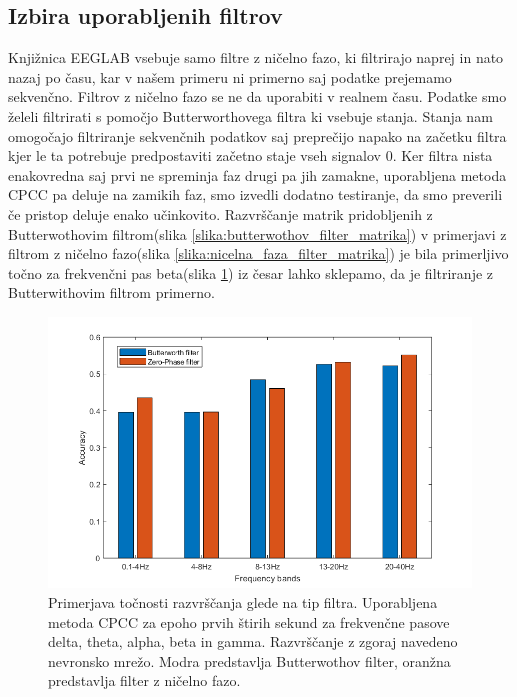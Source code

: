 \subsection{Izbira uporabljenih filtrov}
Knjižnica EEGLAB vsebuje samo filtre z ničelno fazo, ki filtrirajo naprej in nato nazaj po času, kar v našem primeru ni primerno saj podatke prejemamo sekvenčno. Filtrov z ničelno fazo se ne da uporabiti v realnem času. Podatke smo želeli filtrirati s pomočjo Butterworthovega filtra ki vsebuje stanja. Stanja nam omogočajo filtriranje sekvenčnih podatkov saj preprečijo napako na začetku filtra kjer le ta potrebuje predpostaviti začetno staje vseh signalov 0. Ker filtra nista enakovredna saj prvi ne spreminja faz drugi pa jih zamakne, uporabljena metoda CPCC pa deluje na zamikih faz, smo izvedli dodatno testiranje, da smo preverili če pristop deluje enako učinkovito. Razvrščanje matrik pridobljenih z Butterwothovim filtrom(slika \ref{slika:butterwothov_filter_matrika}) v primerjavi z filtrom z ničelno fazo(slika \ref{slika:nicelna_faza_filter_matrika}) je bila primerljivo točno za frekvenčni pas beta(slika \ref{slika:primerjava_filtrov}) iz česar lahko sklepamo, da je filtriranje z Butterwithovim filtrom primerno.
\begin{figure}
    \begin{center}
    \includegraphics[width=1 \linewidth]{slike/ComparisonFilters.png}
    \end{center}
    \caption{Primerjava točnosti razvrščanja glede na tip filtra. Uporabljena metoda CPCC za epoho prvih štirih sekund za frekvenčne pasove delta, theta, alpha, beta in gamma. Razvrščanje z zgoraj navedeno nevronsko mrežo. Modra predstavlja Butterwothov filter, oranžna predstavlja filter z ničelno fazo.}
    \label{slika:primerjava_filtrov}
\end{figure}

